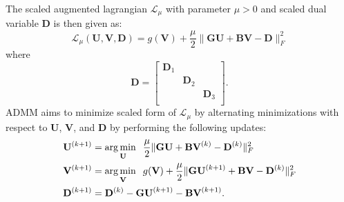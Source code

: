 The scaled augmented lagrangian $\mathcal{L}_\mu$ with parameter $\mu > 0$ and scaled dual variable $\mathbf{D}$ is then given as:
\begin{equation}
  \label{admm:lagrangian-ae}
  \mathcal{L}_{\mu}(\mathbf{U}, \mathbf{V}, \mathbf{D}) = g(\mathbf{V}) + \frac{\mu}{2} \|\mathbf{GU} + \mathbf{BV} - \mathbf{D}\|_F^2
\end{equation}
where
$$
\mathbf{D} = 
\begin{bmatrix}
\mathbf{D}_1 &  &  \\
  &\mathbf{D}_2&  \\
&  & \mathbf{D}_3 \\
\end{bmatrix}.
$$
ADMM aims to minimize scaled form of $\mathcal{L}_{\mu}$ by alternating minimizations with respect to $\mathbf{U}$, $\mathbf{V}$, and $\mathbf{D}$ by performing the following updates:
\begin{equation}
  \label{admm:ae-updates}
  \begin{aligned}
    \mathbf{U}^{(k+1)} &= \operatorname*{arg\,min \;\;}_{\mathbf{U}}  \frac{\mu}{2} \|\mathbf{GU} + \mathbf{BV}^{(k)} - \mathbf{D}^{(k)}\|_F^2 \\
    \mathbf{V}^{(k+1)} &= \operatorname*{arg\,min \;\;}_{\mathbf{V}} g(\mathbf{V}) + \frac{\mu}{2} \|\mathbf{GU}^{(k+1)} + \mathbf{BV} - \mathbf{D}^{(k)}\|_F^2 \\
    \mathbf{D}^{(k+1)} &= \mathbf{D}^{(k)} - \mathbf{GU}^{(k+1)} - \mathbf{BV}^{(k+1)}.
    \end{aligned}
\end{equation}

